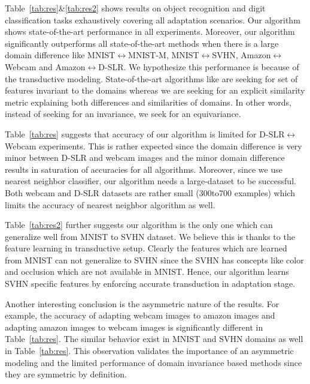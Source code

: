 Table~\ref{tab:res}\&\ref{tab:res2} shows results on object recognition and digit classification tasks exhaustively covering all adaptation scenarios. Our algorithm shows state-of-the-art performance in all experiments. Moreover, our algorithm significantly outperforms all state-of-the-art methods when there is a large domain difference like MNIST$\leftrightarrow$MNIST-M, MNIST$\leftrightarrow$SVHN, Amazon$\leftrightarrow$Webcam and Amazon$\leftrightarrow$D-SLR. We hypothesize this performance is because of the transductive modeling. State-of-the-art algorithms like \cite{ganin15} are seeking for set of features invariant to the domains whereas we are seeking for an explicit similarity metric explaining both differences and similarities of domains. In other words, instead of seeking for an invariance, we seek for an equivariance.

Table~\ref{tab:res} suggests that accuracy of our algorithm is limited  for D-SLR$\leftrightarrow$Webcam experiments. This is rather expected since the domain difference is very minor between D-SLR and webcam images and the minor domain difference results in saturation of accuracies for all algorithms. Moreover, since we use nearest neighbor classifier, our algorithm needs a large-dataset to be successful. Both webcam and D-SLR datasets are rather small (300to700 examples) which limits the accuracy of nearest neighbor algorithm as well.

Table~\ref{tab:res2} further suggests our algorithm is the only one which can generalize well from MNIST to SVHN dataset. We believe this is thanks to the feature learning in transductive setup. Clearly the features which are learned from MNIST can not generalize to SVHN since the SVHN has concepts like color and occlusion which are not available in MNIST. Hence, our algorithm learns SVHN specific features by enforcing accurate transduction in adaptation stage.

Another interesting conclusion is the asymmetric nature of the results. For example, the accuracy of adapting webcam images to amazon images and adapting amazon images to webcam images is significantly different in Table~\ref{tab:res}. The similar behavior exist in MNIST and SVHN domains as well in Table~\ref{tab:res}. This observation validates the importance of an asymmetric modeling and the limited performance of domain invariance based methods since they are symmetric by definition. 

